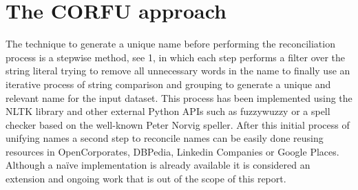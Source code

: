 \documentclass{llncs}
\begin{document}
% 
% 
% 
 \section{The CORFU approach}
 
The technique to generate a unique name before performing the reconciliation process is a stepwise method, see 1, in which each step performs a filter over 
the string literal trying to remove all unnecessary words in the name to finally use an iterative process of string comparison and grouping to generate a unique 
and relevant name for the input dataset. This process has been implemented using the NLTK library and other external Python APIs such as fuzzywuzzy or a spell 
checker based on the well-known Peter Norvig speller. After this initial process of unifying names a second step to reconcile names can be easily done reusing 
resources in OpenCorporates, DBPedia, Linkedin Companies or Google Places. Although a naïve implementation is already available it is considered an 
extension and ongoing work that is out of the scope of this report.  
% 
\end{document}

